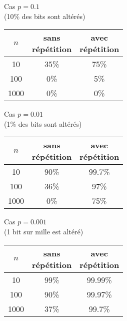 \documentclass[11pt,class=report,crop=false]{standalone}
\begin{document}
\begin{center}
\small
\begin{minipage}{0.3\textwidth}
\center

Cas $p=0.1$ \\
(10\% des bits sont altérés)

\bigskip

\begin{tabular}{c|cc}
$n$  & \shortstack{sans \\ répétition} &  \shortstack{avec \\ répétition} \\ \hline
10   & 35\% & 75\% \\
100  & 0\% & 5\% \\
1000 & 0\% & 0\% \\
\end{tabular}
\end{minipage}
\qquad
\begin{minipage}{0.3\textwidth}
\center

Cas $p=0.01$ \\
(1\% des bits sont altérés)

\bigskip

\begin{tabular}{c|cc}
$n$  & \shortstack{sans \\ répétition} &  \shortstack{avec \\ répétition} \\ \hline
10   & 90\% & 99.7\% \\
100  & 36\% & 97\% \\
1000 & 0\% & 75\% \\
\end{tabular}
\end{minipage}
\qquad
\begin{minipage}{0.3\textwidth}
\center

Cas $p=0.001$ \\
(1 bit sur mille est altéré)

\bigskip

\begin{tabular}{c|cc}
$n$  & \shortstack{sans \\ répétition} &  \shortstack{avec \\ répétition} \\ \hline
10   & 99\% & 99.99\% \\
100  & 90\% & 99.97\% \\
1000 & 37\% & 99.7\% \\
\end{tabular}
\end{minipage}
\end{center}
\end{document}
